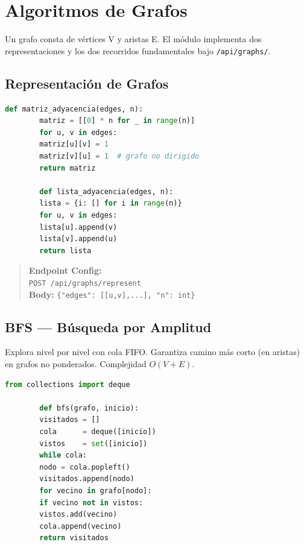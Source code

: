 \documentclass[12pt, letterpaper]{article}
\begin{document}
	\section{Algoritmos de Grafos}
	Un grafo consta de vértices V y aristas E. El módulo implementa dos representaciones y los dos recorridos fundamentales bajo \texttt{/api/graphs/}.
	
	\subsection{Representación de Grafos}
	\begin{lstlisting}[language=Python, caption={Matriz y Lista de Adyacencia}]
		def matriz_adyacencia(edges, n):
		matriz = [[0] * n for _ in range(n)]
		for u, v in edges:
		matriz[u][v] = 1
		matriz[v][u] = 1  # grafo no dirigido
		return matriz
		
		def lista_adyacencia(edges, n):
		lista = {i: [] for i in range(n)}
		for u, v in edges:
		lista[u].append(v)
		lista[v].append(u)
		return lista
	\end{lstlisting}
	
	\begin{quote}
		\textbf{Endpoint Config:} \\
		\texttt{POST /api/graphs/represent} \\
		\textbf{Body:} \texttt{\{"edges": [[u,v],...], "n": int\}}
	\end{quote}
	
	\subsection{BFS — Búsqueda por Amplitud}
	Explora nivel por nivel con cola FIFO. Garantiza camino más corto (en aristas) en grafos no ponderados. Complejidad $O(V + E)$.
	
	\begin{lstlisting}[language=Python, caption={Implementacion BFS}]
		from collections import deque
		
		def bfs(grafo, inicio):
		visitados = []
		cola      = deque([inicio])
		vistos    = set([inicio])
		while cola:
		nodo = cola.popleft()
		visitados.append(nodo)
		for vecino in grafo[nodo]:
		if vecino not in vistos:
		vistos.add(vecino)
		cola.append(vecino)
		return visitados
	\end{lstlisting}
	
\end{document}
